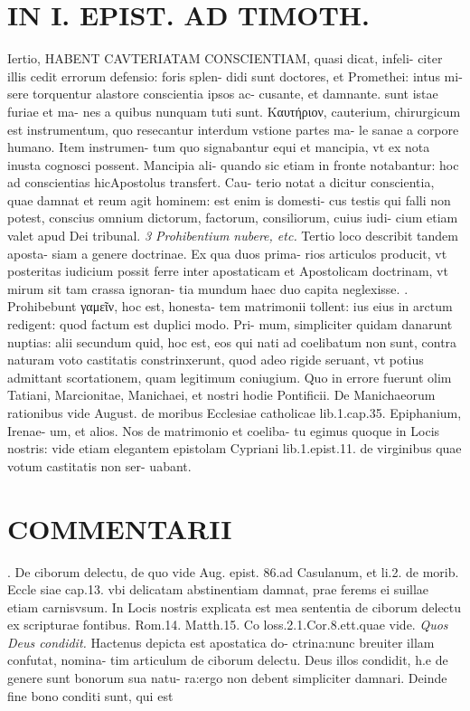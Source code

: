 \documentclass{article}
\begin{document}
\begin{pages}
\section*{IN I. EPIST. AD TIMOTH. }
\marginpar{[ p.89 ]}\pstart Iertio, HABENT CAVTERIATAM CONSCIENTIAM, quasi dicat, infeli- citer illis cedit errorum defensio: foris splen- didi sunt doctores, et Promethei: intus mi- sere torquentur alastore conscientia ipsos ac- cusante, et damnante. sunt istae furiae et ma- nes a quibus nunquam tuti sunt. Καυτήριον, cauterium, chirurgicum est instrumentum, quo resecantur interdum vstione partes ma- le sanae a corpore humano. Item instrumen- tum quo signabantur equi et mancipia, vt ex nota inusta cognosci possent. Mancipia ali- quando sic etiam in fronte notabantur: hoc ad conscientias hicApostolus transfert. Cau- terio notat a dicitur conscientia, quae damnat et reum agit hominem: est enim is domesti- cus testis qui falli non potest, conscius omnium dictorum, factorum, consiliorum, cuius iudi- cium etiam valet apud Dei tribunal.  \pend
\textit{3 Prohibentium nubere, etc. }\pstart Tertio loco describit tandem aposta- siam a genere doctrinae. Ex qua duos prima- rios articulos producit, vt posteritas iudicium possit ferre inter apostaticam et Apostolicam doctrinam, vt mirum sit tam crassa ignoran- tia mundum haec duo capita neglexisse.  \pend{}. Prohibebunt γαμεῖν, hoc est, honesta- tem matrimonii tollent: ius eius in arctum redigent: quod factum est duplici modo. Pri-  \pend
\marginpar{[ p.90 ]}\pstart mum, simpliciter quidam danarunt nuptias: alii secundum quid, hoc est, eos qui nati ad coelibatum non sunt, contra naturam voto castitatis constrinxerunt, quod adeo rigide seruant, vt potius admittant scortationem, quam legitimum coniugium. Quo in errore fuerunt olim Tatiani, Marcionitae, Manichaei, et nostri hodie Pontificii. De Manichaeorum rationibus vide August. de moribus Ecclesiae catholicae lib.1.cap.35. Epiphanium, Irenae- um, et alios. Nos de matrimonio et coeliba- tu egimus quoque in Locis nostris: vide etiam elegantem epistolam Cypriani lib.1.epist.11. de virginibus quae votum castitatis non ser- uabant.  \pend
\section*{COMMENTARII }. De ciborum delectu, de quo vide Aug. epist. 86.ad Casulanum, et li.2. de morib. Eccle siae cap.13. vbi delicatam abstinentiam damnat, prae ferems ei suillae etiam carnisvsum. In Locis nostris explicata est mea sententia de ciborum delectu ex scripturae fontibus. Rom.14. Matth.15. Co loss.2.1.Cor.8.ett.quae vide.  \pend
\textit{Quos Deus condidit. }\pstart Hactenus depicta est apostatica do- ctrina:nunc breuiter illam confutat, nomina- tim articulum de ciborum delectu. Deus illos condidit, h.e de genere sunt bonorum sua natu- ra:ergo non debent simpliciter damnari.  \pend\pstart Deinde fine bono conditi sunt, qui est  \pend

\end{pages}
\end{document}
